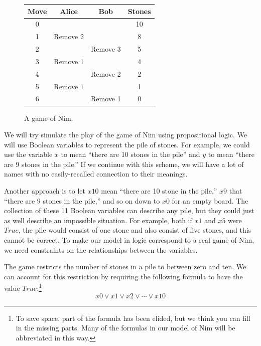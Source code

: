 {{\begin{figure}
\begin{center}
\begin{tabular}{c|c|c|c}
Move & Alice     & Bob      & Stones \\
\hline
0    &           &          & 10     \\
1    & Remove 2  &          & 8      \\
2    &           & Remove 3 & 5      \\
3    & Remove 1  &          & 4      \\
4    &           & Remove 2 & 2      \\
5    & Remove 1  &          & 1      \\
6    &           & Remove 1 & 0      \\
\end{tabular}
\end{center}
\caption{A game of Nim.}
\label{fig:example-nim-game}
\end{figure}

We will try simulate the play of the game of Nim using propositional logic.
We will use Boolean variables to represent the pile of stones.
For example, we could use the variable $x$ to mean ``there are 10 stones in the pile''
and $y$ to mean ``there are 9 stones in the pile.''
If we continue with this scheme, we will have a lot of names with
no easily-recalled connection to their meanings.

Another approach is to let $x10$ mean ``there are 10 stone in the pile,''
$x9$ that ``there are 9 stones in the pile,'' and so on
down to $x0$ for an empty board.
The collection of these 11 Boolean variables can describe any pile,
but they could just as well describe an impossible situation.
For example, both if $x1$ and $x5$ were $True$,
the pile would consist of one stone and also consist of five stones,
and this cannot be correct.
To make our model in logic correspond to a real game of Nim,
we need constraints on the relationships between the variables.

The game restricts the number
of stones in a pile to between zero and ten.
We can account for this restriction by requiring
the following formula to have the value $True$:\footnote{To
save space, part of the formula has
been elided, but we think you can fill in the missing parts.
Many of the formulas in our model of Nim will be abbreviated in this way.}
$$x0 \vee x1 \vee x2 \vee \cdots \vee x10$$

}}

